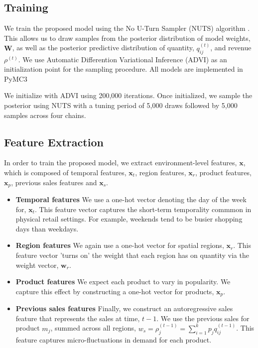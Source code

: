 \subsection{Training} We train the proposed model using the No U-Turn Sampler (NUTS) algorithm \cite{nuts}. This allows us to draw samples from the posterior distribution of model weights, $\textbf{W}$, as well as the posterior predictive distribution of quantity, $q_{ij}^{(t)}$, and revenue $\rho^{(t)}$. We use Automatic Differention Variational Inference (ADVI) \cite{advi} as an initialization point for the sampling procedure. All models are implemented in PyMC3 \cite{pymc3}

We initialize with ADVI using 200,000 iterations. Once initialized, we sample the posterior using NUTS with a tuning period of 5,000 draws followed by 5,000 samples across four chains.


\subsection{Feature Extraction}\label{features}
In order to train the proposed model, we extract environment-level features, $\textbf{x}$, which is composed of temporal features, $\textbf{x}_t$,  region features, $\textbf{x}_r$, product features, $\textbf{x}_p$, previous sales features and $\textbf{x}_s$.

\begin{itemize}
    \item \textbf{Temporal features} We use a one-hot vector denoting the day of the week for, $\textbf{x}_t$. This feature vector captures the short-term temporality commmon in physical retail settings. For example, weekends tend to be busier shopping days than weekdays. 
    \item \textbf{Region features} We again use a one-hot vector for spatial regions, $\textbf{x}_r$. This feature vector 'turns on' the weight that each region has on quantity via the weight vector, $\textbf{w}_r$.
    \item \textbf{Product features} We expect each product to vary in popularity. We capture this effect by constructing a one-hot vector for products, $\textbf{x}_p$.
    \item \textbf{Previous sales features} Finally, we construct an autoregressive sales feature that represents the sales at time, $t-1$. We use the previous sales for product $m_j$, summed across all regions, $w_s = \rho_j^{(t-1)} = \sum_{i=1}^k p_j q_{ij}^{(t-1)}$. This feature captures micro-fluctuations in demand for each product. 
\end{itemize}



